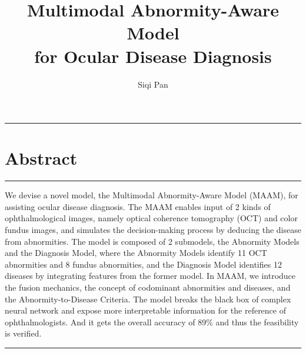 \documentclass{article}
\begin{document}
	\title{\vspace{-2.25cm} Multimodal Abnormity-Aware Model\\for Ocular Disease Diagnosis}
	\author{Siqi Pan}
	\date{}
	\maketitle
	
	\vspace{-0.2cm}
	\hrule
	\vspace{-0.1cm}
	\section*{Abstract}
	\hrule
	\vspace{0.4cm}
	We devise a novel model, the Multimodal Abnormity-Aware Model (MAAM), for assisting ocular disease diagnosis. The MAAM enables input of 2 kinds of ophthalmological images, namely optical coherence tomography (OCT) and color fundus images, and simulates the decision-making process by deducing the disease from abnormities. The model is composed of 2 submodels, the Abnormity Models and the Diagnosis Model, where the Abnormity Models identify 11 OCT abnormities and 8 fundus abnormities, and the Diagnosis Model identifies 12 diseases by integrating features from the former model. In MAAM, we introduce the fusion mechanics, the concept of codominant abnormities and diseases, and the Abnormity-to-Disease Criteria.  The model breaks the black box of complex neural network and expose more interpretable information for the reference of ophthalmologists. And it gets the overall accuracy of 89\% and thus the feasibility is verified.
	\vspace{0.4cm}
	\hrule
	\vspace{1cm}
	
\end{document}
